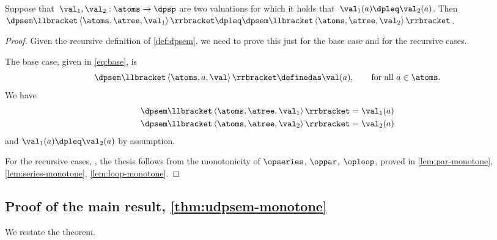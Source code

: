 \begin{lemma}
    \label{lem:dpsem-monotone}
    Suppose that~$\val_{1},\val_{2}:\atoms\rightarrow\dpsp$
    are two valuations for which it holds that~$\val_{1}(a)\dpleq\val_{2}(a)$.
    Then~$\dpsem\llbracket\left\langle \atoms,\atree,\val_{1}\right\rangle \rrbracket\dpleq\dpsem\llbracket\left\langle \atoms,\atree,\val_{2}\right\rangle \rrbracket$.
\end{lemma}
\begin{proof}
    Given the recursive definition of \cref{def:dpsem}, we need
    to prove this just for the base case and for the recursive cases.

    The base case, given in \cref{eq:base}, is
    \[
        \dpsem\llbracket\left\langle \atoms,a,\val\right\rangle \rrbracket\definedas\val(a),\qquad\text{for all}\ a\in\atoms.
    \]
    We have
    \begin{align*}
        \dpsem\llbracket\left\langle \atoms,\atree,\val_{1}\right\rangle \rrbracket & =\val_{1}(a) \\
        \dpsem\llbracket\left\langle \atoms,\atree,\val_{2}\right\rangle \rrbracket & =\val_{2}(a)
    \end{align*}
    and $\val_{1}(a)\dpleq\val_{2}(a)$ by assumption.

    For the recursive cases, ,
    the thesis follows from the monotonicity of $\opseries$, $\oppar$,
    $\oploop$, proved in \cref{lem:par-monotone}, \cref{lem:series-monotone},
    \cref{lem:loop-monotone}.
\end{proof}

\subsection{Proof of the main result, \cref{thm:udpsem-monotone}}

\label{subsec:proof-main-result}

We restate the theorem.

